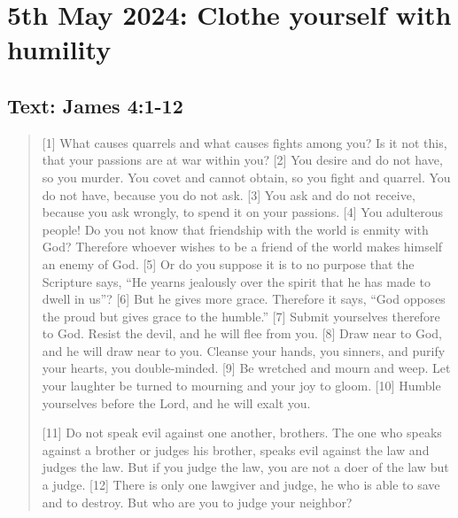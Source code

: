 \setcounter{figure}{0}

\section{5th May 2024: Clothe yourself with humility}
\subsection*{Text: James 4:1-12}
  \begin{quote}
    [1] What causes quarrels and what causes fights among you? Is it not this, that your passions are at war within you? [2] You desire and do not have, so you murder. You covet and cannot obtain, so you fight and quarrel. You do not have, because you do not ask. [3] You ask and do not receive, because you ask wrongly, to spend it on your passions. [4] You adulterous people! Do you not know that friendship with the world is enmity with God? Therefore whoever wishes to be a friend of the world makes himself an enemy of God. [5] Or do you suppose it is to no purpose that the Scripture says, “He yearns jealously over the spirit that he has made to dwell in us”? [6] But he gives more grace. Therefore it says, “God opposes the proud but gives grace to the humble.” [7] Submit yourselves therefore to God. Resist the devil, and he will flee from you. [8] Draw near to God, and he will draw near to you. Cleanse your hands, you sinners, and purify your hearts, you double-minded. [9] Be wretched and mourn and weep. Let your laughter be turned to mourning and your joy to gloom. [10] Humble yourselves before the Lord, and he will exalt you.

    [11] Do not speak evil against one another, brothers. The one who speaks against a brother or judges his brother, speaks evil against the law and judges the law. But if you judge the law, you are not a doer of the law but a judge. [12] There is only one lawgiver and judge, he who is able to save and to destroy. But who are you to judge your neighbor?
  \end{quote}
